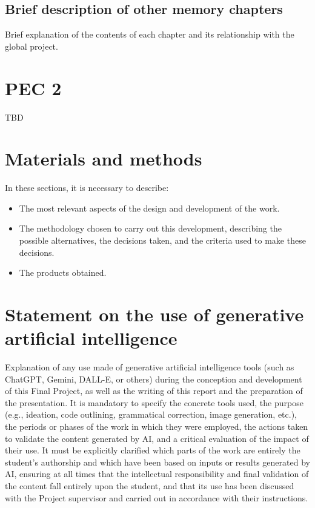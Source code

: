 \documentclass[ENG,BIB]{TFUOC}%
\begin{document}

\section{Brief description of other memory chapters}

Brief explanation of the contents of each chapter and its relationship with the global project.

\chapter{PEC 2}

TBD




\chapter{Materials and methods}
In these sections, it is necessary to describe:
\begin{itemize}
    \item The most relevant aspects of the design and development of the work.
    \item The methodology chosen to carry out this development, describing the possible alternatives, the decisions taken, and the criteria used to make these decisions.
    \item The products obtained.
\end{itemize}

\chapter{Statement on the use of generative artificial intelligence}

Explanation of any use made of generative artificial intelligence tools (such as ChatGPT, Gemini, DALL-E, or others) during the conception and development of this Final Project, as well as the writing of this report and the preparation of the presentation. It is mandatory to specify the concrete tools used, the purpose (e.g., ideation, code outlining, grammatical correction, image generation, etc.), the periods or phases of the work in which they were employed, the actions taken to validate the content generated by AI, and a critical evaluation of the impact of their use. It must be explicitly clarified which parts of the work are entirely the student's authorship and which have been based on inputs or results generated by AI, ensuring at all times that the intellectual responsibility and final validation of the content fall entirely upon the student, and that its use has been discussed with the Project supervisor and carried out in accordance with their instructions.
\end{document}
